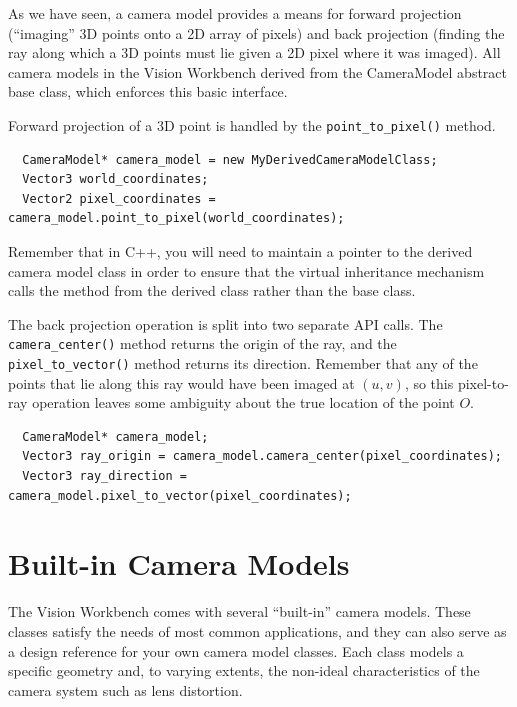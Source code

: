 As we have seen, a camera model provides a means for forward
projection (``imaging'' 3D points onto a 2D array of pixels) and back
projection (finding the ray along which a 3D points must lie given a
2D pixel where it was imaged).  All camera models in the Vision
Workbench derived from the CameraModel abstract base class, which
enforces this basic interface.

Forward projection of a 3D point is handled by the
\verb#point_to_pixel()# method.
\begin{verbatim}
  CameraModel* camera_model = new MyDerivedCameraModelClass;
  Vector3 world_coordinates;
  Vector2 pixel_coordinates = camera_model.point_to_pixel(world_coordinates);
\end{verbatim}
Remember that in C++, you will need to maintain a pointer to the
derived camera model class in order to ensure that the virtual
inheritance mechanism calls the method from the derived class rather
than the base class.

The back projection operation is split into two separate API calls.
The \verb#camera_center()# method returns the origin of the ray, and
the \verb#pixel_to_vector()# method returns its direction.  Remember
that any of the points that lie along this ray would have been imaged
at $(u,v)$, so this pixel-to-ray operation leaves some ambiguity about
the true location of the point $O$.
\begin{verbatim}
  CameraModel* camera_model;  
  Vector3 ray_origin = camera_model.camera_center(pixel_coordinates);
  Vector3 ray_direction = camera_model.pixel_to_vector(pixel_coordinates);
\end{verbatim}
\begin{center}
\end{center}

\section{Built-in Camera Models}
\label{sec:built-in-cameras}
The Vision Workbench comes with several ``built-in'' camera models.
These classes satisfy the needs of most common applications, and they
can also serve as a design reference for your own camera model
classes.  Each class models a specific geometry and, to varying
extents, the non-ideal characteristics of the camera system such as
lens distortion.

